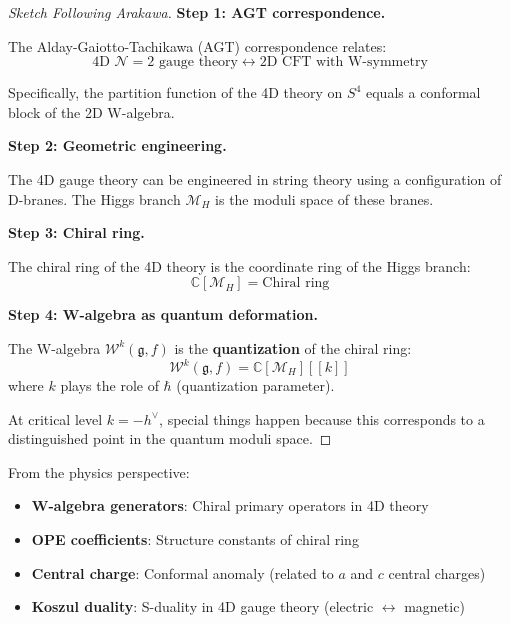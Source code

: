 \begin{proof}[Sketch Following Arakawa]
\textbf{Step 1: AGT correspondence.}

The Alday-Gaiotto-Tachikawa (AGT) correspondence relates:
\begin{equation}
\text{4D } \mathcal{N}=2 \text{ gauge theory} \leftrightarrow \text{2D CFT with W-symmetry}
\end{equation}

Specifically, the partition function of the 4D theory on $S^4$ equals a conformal block 
of the 2D W-algebra.

\textbf{Step 2: Geometric engineering.}

The 4D gauge theory can be engineered in string theory using a configuration of D-branes. 
The Higgs branch $\mathcal{M}_H$ is the moduli space of these branes.

\textbf{Step 3: Chiral ring.}

The chiral ring of the 4D theory is the coordinate ring of the Higgs branch:
\begin{equation}
\mathbb{C}[\mathcal{M}_H] = \text{Chiral ring}
\end{equation}

\textbf{Step 4: W-algebra as quantum deformation.}

The W-algebra $\mathcal{W}^k(\mathfrak{g}, f)$ is the \textbf{quantization} of the 
chiral ring:
\begin{equation}
\mathcal{W}^k(\mathfrak{g}, f) = \mathbb{C}[\mathcal{M}_H][[k]]
\end{equation}
where $k$ plays the role of $\hbar$ (quantization parameter).

At critical level $k = -h^\vee$, special things happen because this corresponds to a 
distinguished point in the quantum moduli space.
\end{proof}

\begin{remark}
From the physics perspective:
\begin{itemize}
\item \textbf{W-algebra generators}: Chiral primary operators in 4D theory
\item \textbf{OPE coefficients}: Structure constants of chiral ring
\item \textbf{Central charge}: Conformal anomaly (related to $a$ and $c$ central charges)
\item \textbf{Koszul duality}: S-duality in 4D gauge theory (electric $\leftrightarrow$ 
magnetic)
\end{itemize}
\end{remark}

